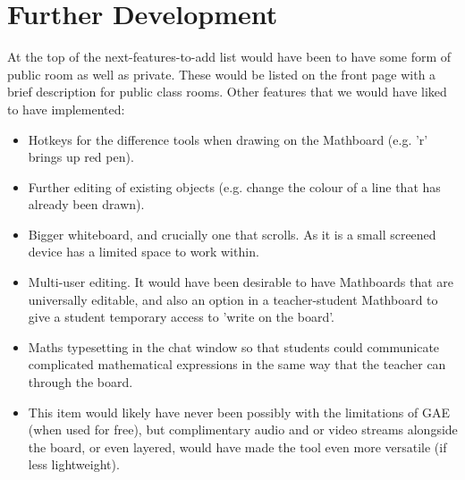 \section{Further Development}
At the top of the next-features-to-add list would have been to have some form of public room as well as private. These would be listed on the front page with a brief description for public class rooms. Other features that we would have liked to have implemented:
\begin{itemize}
   \item Hotkeys for the difference tools when drawing on the Mathboard (e.g. 'r' brings up red pen).\vspace{-2mm}
   \item Further editing of existing objects (e.g. change the colour of a line that has already been drawn).\vspace{-2mm}
   \item Bigger whiteboard, and crucially one that scrolls. As it is a small screened device has a limited space to work within.\vspace{-2mm}
   \item Multi-user editing. It would have been desirable to have Mathboards that are universally editable, and also an option in a teacher-student Mathboard to give a student temporary access to 'write on the board'.\vspace{-2mm}
   \item Maths typesetting in the chat window so that students could communicate complicated mathematical expressions in the same way that the teacher can through the board.\vspace{-2mm}
   \item This item would likely have never been possibly with the limitations of GAE (when used for free), but complimentary audio and or video streams alongside the board, or even layered, would have made the tool even more versatile (if less lightweight).\vspace{-2mm}
\end{itemize}